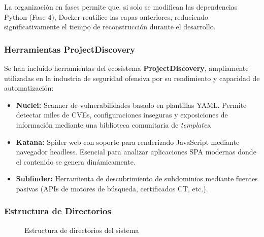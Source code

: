 La organización en fases permite que, si solo se modifican las dependencias Python (Fase 4), Docker reutilice las capas anteriores, reduciendo significativamente el tiempo de reconstrucción durante el desarrollo.

\subsubsection{Herramientas ProjectDiscovery}

Se han incluido herramientas del ecosistema \textbf{ProjectDiscovery}, ampliamente utilizadas en la industria de seguridad ofensiva por su rendimiento y capacidad de automatización:

\begin{itemize}
    \item \textbf{Nuclei:} Scanner de vulnerabilidades basado en plantillas YAML. Permite detectar miles de CVEs, configuraciones inseguras y exposiciones de información mediante una biblioteca comunitaria de \textit{templates}.
    \item \textbf{Katana:} Spider web con soporte para renderizado JavaScript mediante navegador headless. Esencial para analizar aplicaciones SPA modernas donde el contenido se genera dinámicamente.
    \item \textbf{Subfinder:} Herramienta de descubrimiento de subdominios mediante fuentes pasivas (APIs de motores de búsqueda, certificados CT, etc.).
\end{itemize}

\subsubsection{Estructura de Directorios}

\begin{figure}[ht]
    \centering
    \renewcommand*\DTstylecomment{\rmfamily\color{gray}\textsc}
    \begin{minipage}{0.9\textwidth} %
    \end{minipage}
    \caption{Estructura de directorios del sistema}
    \label{fig:directorios}
\end{figure}

